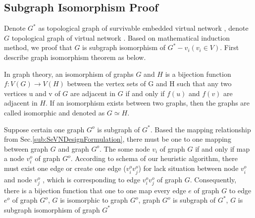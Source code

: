 \subsection{Subgraph Isomorphism Proof}
\label{sec:SubgraphIsomorphismProof}
Denote $G^*$ as topological graph of survivable embedded virtual network  , denote $G$ topological graph of  virtual network . Based on mathematical induction method, we proof that $G$ is subgraph isomorphism of $G^*-v_i (v_i\in V)$. First describe graph isomorphism theorem as below.
\begin{theorem}
In graph theory, an isomorphism of graphs $G$ and $H$ is a bijection function $f:V(G)\rightarrow V(H)$ between the vertex sets of G and H such that any two vertices u and v of $G$ are adjacent in $G$ if and only if $f(u)$ and $f(v)$ are adjacent in $H$. If an isomorphism exists between two graphs, then the graphs are called isomorphic and denoted as $G\simeq H$.
\end{theorem}

Suppose certain one graph $G^o$ is subgraph of $G^*$. Based the mapping relationship from Sec.\ref{sub:SeVNDesignFormulation}, there must be one to one mapping between graph $G$ and graph $G^o$. The some node $v_i$ of graph $G$ if and only if map a node $v_i^o$ of graph $G^o$. According to schema of our heuristic algorithm, there must exist one edge or create one edge ($v^o_iv^o_j$) for lack situation between node $v^o_i$ and node $v^o_j$ , which is corresponding to edge $v^o_iv^o_j$ of graph $G$. Consequently, there is a bijection function that one to one map every edge $e$ of graph $G$ to edge $e^o$ of graph $G^o$, $G$ is isomorphic to graph $G^o$, graph $G^o$ is subgraph of $G^*$, $G$ is subgraph isomorphism of graph $G^*$

